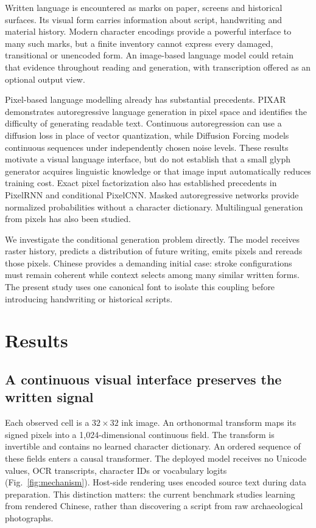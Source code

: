 Written language is encountered as marks on paper, screens and historical
surfaces. Its visual form carries information about script, handwriting and
material history. Modern character encodings provide a powerful interface to
many such marks, but a finite inventory cannot express every damaged,
transitional or unencoded form. An image-based language model could retain
that evidence throughout reading and generation, with transcription offered
as an optional output view.

Pixel-based language modelling already has substantial precedents.
PIXAR demonstrates autoregressive language generation in pixel space and
identifies the difficulty of generating readable text\cite{pixar}. Continuous
autoregression can use a diffusion loss in place of vector quantization\cite{mar},
while Diffusion Forcing models continuous sequences under independently chosen
noise levels\cite{forcing}. These results motivate a visual language interface,
but do not establish that a small glyph generator acquires linguistic
knowledge or that image input automatically reduces training cost.
Exact pixel factorization also has established precedents in PixelRNN and
conditional PixelCNN\cite{pixelrnn,pixelcnn}. Masked autoregressive networks
provide normalized probabilities without a character dictionary\cite{made}.
Multilingual generation from pixels has also been studied\cite{mixar}.

We investigate the conditional generation problem directly. The model
receives raster history, predicts a distribution of future writing, emits
pixels and rereads those pixels. Chinese provides a demanding initial case:
stroke configurations must remain coherent while context selects among many
similar written forms. The present study uses one canonical font to isolate
this coupling before introducing handwriting or historical scripts.

\section*{Results}
\subsection*{A continuous visual interface preserves the written signal}
Each observed cell is a $32\times32$ ink image. An orthonormal transform maps
its signed pixels into a 1,024-dimensional continuous field. The transform is
invertible and contains no learned character dictionary. An ordered sequence
of these fields enters a causal transformer. The deployed model receives no
Unicode values, OCR transcripts, character IDs or vocabulary logits
(Fig.~\ref{fig:mechanism}). Host-side rendering uses encoded source text during
data preparation. This distinction matters: the current benchmark studies
learning from rendered Chinese, rather than discovering a script from raw
archaeological photographs.

